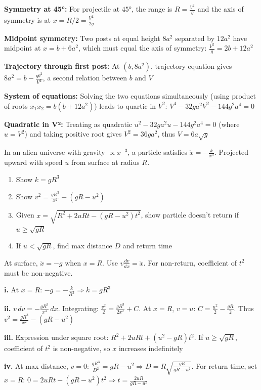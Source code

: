 \begin{takeaways}
\item \textbf{Symmetry at 45°:} For projectile at $45°$, the range is $R = \frac{V^2}{g}$ and the axis of symmetry is at $x = R/2 = \frac{V^2}{2g}$
\item \textbf{Midpoint symmetry:} Two posts at equal height $8a^2$ separated by $12a^2$ have midpoint at $x = b + 6a^2$, which must equal the axis of symmetry: $\frac{V^2}{g} = 2b + 12a^2$
\item \textbf{Trajectory through first post:} At $(b, 8a^2)$, trajectory equation gives $8a^2 = b - \frac{gb^2}{V^2}$, a second relation between $b$ and $V$
\item \textbf{System of equations:} Solving the two equations simultaneously (using product of roots $x_1 x_2 = b(b+12a^2)$) leads to quartic in $V^2$: $V^4 - 32ga^2V^2 - 144g^2a^4 = 0$
\item \textbf{Quadratic in V²:} Treating as quadratic $u^2 - 32ga^2u - 144g^2a^4 = 0$ (where $u = V^2$) and taking positive root gives $V^2 = 36ga^2$, thus $V = 6a\sqrt{g}$
\end{takeaways}

\begin{problem}
In an alien universe with gravity $\propto x^{-3}$, a particle satisfies $\ddot{x} = -\frac{k}{x^3}$. Projected upward with speed $u$ from surface at radius $R$.

\begin{enumerate}[label=\textbf{\roman*.}]
    \item Show $k = gR^3$
    \item Show $v^2 = \frac{gR^3}{x^2} - (gR - u^2)$
    \item Given $x = \sqrt{R^2 + 2uRt - (gR-u^2)t^2}$, show particle doesn't return if $u \ge \sqrt{gR}$
    \item If $u < \sqrt{gR}$, find max distance $D$ and return time
\end{enumerate}
\end{problem}

\begin{hint}
At surface, $\ddot{x} = -g$ when $x = R$. Use $v\frac{dv}{dx} = \ddot{x}$. For non-return, coefficient of $t^2$ must be non-negative.
\end{hint}

\begin{solution}
\textbf{i.} At $x = R$: $-g = -\frac{k}{R^3} \Rightarrow k = gR^3$ 

\textbf{ii.} $v\,dv = -\frac{gR^3}{x^3}\,dx$. Integrating: $\frac{v^2}{2} = \frac{gR^3}{2x^2} + C$. At $x=R$, $v=u$: $C = \frac{u^2}{2} - \frac{gR}{2}$. Thus $v^2 = \frac{gR^3}{x^2} - (gR-u^2)$ 

\textbf{iii.} Expression under square root: $R^2 + 2uRt + (u^2-gR)t^2$. If $u \ge \sqrt{gR}$, coefficient of $t^2$ is non-negative, so $x$ increases indefinitely 

\textbf{iv.} At max distance, $v=0$: $\frac{gR^3}{D^2} = gR - u^2 \Rightarrow D = R\sqrt{\frac{gR}{gR-u^2}}$. For return time, set $x = R$: $0 = 2uRt - (gR-u^2)t^2 \Rightarrow t = \frac{2uR}{gR-u^2}$ 
\end{solution}

